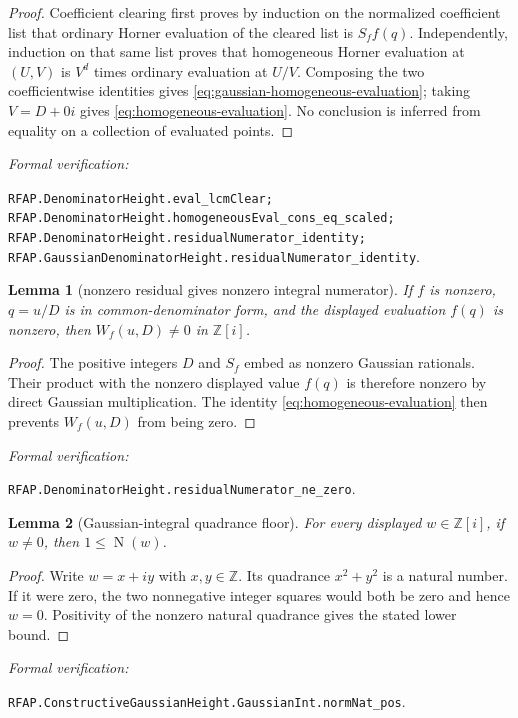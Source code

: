 \documentclass[11pt]{article}
\newtheorem{lemma}[lemma]{Lemma}
\newcommand{\Zi}{\mathbb{Z}[i]}
\newcommand{\Z}{\mathbb{Z}}
\newcommand{\Norm}[1]{\operatorname{N}\!\left(#1\right)}
\newcommand{\leanref}[1]{\par\smallskip\noindent
  \emph{Formal verification:}\par\nobreak
  {\raggedright\nolinkurl{#1}.\par}}
\begin{document}
\begin{proof}
Coefficient clearing first proves by induction on the normalized coefficient
list that ordinary Horner evaluation of the cleared list is $S_ff(q)$.
Independently, induction on that same list proves that homogeneous Horner
evaluation at $(U,V)$ is $V^d$ times ordinary evaluation at $U/V$.  Composing
the two coefficientwise identities gives
\eqref{eq:gaussian-homogeneous-evaluation}; taking $V=D+0i$ gives
\eqref{eq:homogeneous-evaluation}.  No conclusion is inferred from equality
on a collection of evaluated points.
\end{proof}

\leanref{RFAP.DenominatorHeight.eval_lcmClear;
RFAP.DenominatorHeight.homogeneousEval_cons_eq_scaled;
RFAP.DenominatorHeight.residualNumerator_identity;
RFAP.GaussianDenominatorHeight.residualNumerator_identity}

\begin{lemma}[nonzero residual gives nonzero integral numerator]
\label{lem:residual-numerator-nonzero}
If $f$ is nonzero, $q=u/D$ is in common-denominator form, and the displayed
evaluation $f(q)$ is nonzero, then $W_f(u,D)\ne0$ in $\Zi$.
\end{lemma}

\begin{proof}
The positive integers $D$ and $S_f$ embed as nonzero Gaussian rationals.
Their product with the nonzero displayed value $f(q)$ is therefore nonzero by
direct Gaussian multiplication.  The identity
\eqref{eq:homogeneous-evaluation} then prevents $W_f(u,D)$ from being zero.
\end{proof}

\leanref{RFAP.DenominatorHeight.residualNumerator_ne_zero}

\begin{lemma}[Gaussian-integral quadrance floor]
\label{lem:gaussian-integer-floor}
For every displayed $w\in\Zi$, if $w\ne0$, then $1\le\Norm w$.
\end{lemma}

\begin{proof}
Write $w=x+iy$ with $x,y\in\Z$.  Its quadrance $x^2+y^2$ is a natural
number.  If it were zero, the two nonnegative integer squares would both be
zero and hence $w=0$.  Positivity of the nonzero natural quadrance gives the
stated lower bound.
\end{proof}

\leanref{RFAP.ConstructiveGaussianHeight.GaussianInt.normNat_pos}
\end{document}
